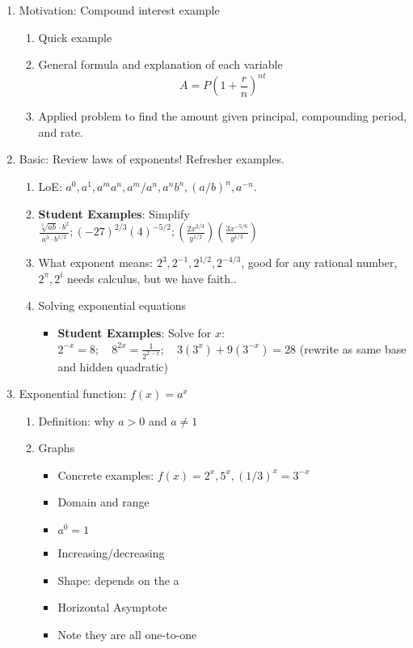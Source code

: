 \documentclass{article}
\newcommand{\ds}{\displaystyle}
\begin{document}
\begin{enumerate}

\item Motivation: Compound interest example
\begin{enumerate}
\item Quick example
\item General formula and explanation of each variable
\[
A = P\left(1+\frac{r}{n}\right)^{nt}
\]
\item Applied problem to find the amount given principal, compounding period, and rate. 
\end{enumerate}


\item Basic: Review laws of exponents! Refresher examples. \\
\begin{enumerate}
\item LoE: $a^0, a^1, a^ma^n, a^m/a^n, a^nb^n, (a/b)^n, a^{-n}$. 
\item {\bf Student Examples}: Simplify $\ds \frac{\sqrt[3]{ab}\cdot b^2}{a^3\cdot b^{1/2}}; (-27)^{2/3}(4)^{-5/2}; \left( \frac{2x^{2/3}}{y^{1/2}}\right)\left( \frac{3x^{-5/6}}{y^{1/3}}\right)$
\item What exponent means: $2^3, 2^{-1}, 2^{1/2}, 2^{-4/3}$, good for any rational number, $2^\pi, 2^i$ needs calculus, but we have faith..
\item Solving exponential equations
\begin{itemize}
\item {\bf Student Examples}: Solve for $x$: $\ds 2^{-x}=8; \quad 8^{2x}=\frac{1}{2^{2-x}}; \quad 3(3^x)+9(3^{-x})=28$ (rewrite as same base and hidden quadratic)
\end{itemize}
\end{enumerate}


\item Exponential function: $f(x) = a^x$
\begin{enumerate}
\item Definition: why $a>0$ and $a\neq1$
\item Graphs
\begin{itemize}
\item Concrete examples: $f(x)=2^x, 5^x, (1/3)^x=3^{-x}$
\item Domain and range
\item $a^0 = 1$
\item Increasing/decreasing
\item Shape: depends on the a
\item Horizontal Asymptote
\item Note they are all one-to-one
\end{itemize}
\end{enumerate}


\end{enumerate}
\end{document}
